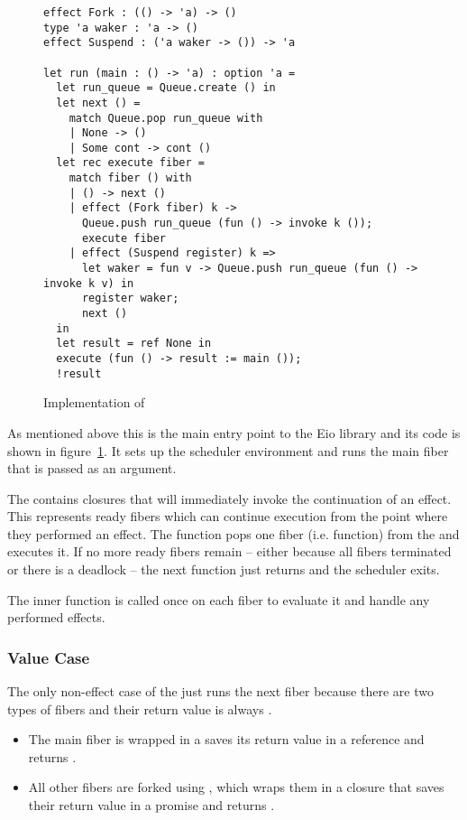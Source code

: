 \subsubsection{}
\label{sec:sched-impl-run}

\begin{figure}[ht]
  \begin{verbatim}
effect Fork : (() -> 'a) -> ()
type 'a waker : 'a -> ()
effect Suspend : ('a waker -> ()) -> 'a

let run (main : () -> 'a) : option 'a =
  let run_queue = Queue.create () in
  let next () =
    match Queue.pop run_queue with
    | None -> ()
    | Some cont -> cont ()
  let rec execute fiber =
    match fiber () with
    | () -> next ()
    | effect (Fork fiber) k ->
      Queue.push run_queue (fun () -> invoke k ());
      execute fiber
    | effect (Suspend register) k =>
      let waker = fun v -> Queue.push run_queue (fun () -> invoke k v) in
      register waker;
      next ()
  in
  let result = ref None in
  execute (fun () -> result := main ());
  !result
  \end{verbatim}
  \caption{Implementation of }
  \label{fig:sched-impl-run}
\end{figure}

As mentioned above this is the main entry point to the Eio library and its code is shown in figure~\ref{fig:sched-impl-run}.
It sets up the scheduler environment and runs the main fiber that is passed as an argument.

The  contains closures that will immediately invoke the continuation of an effect.
This represents ready fibers which can continue execution from the point where they performed an effect.
The  function pops one fiber (i.e. function) from the  and executes it.
If no more ready fibers remain -- either because all fibers terminated or there is a deadlock -- the next function just returns and the scheduler exits.

The inner  function is called once on each fiber to evaluate it and handle any performed effects.
\subsubsection*{Value Case}
The only non-effect case of the  just runs the next fiber because there are two types of fibers and their return value is always \ocamlin{()}.
\begin{itemize}
  \item The main fiber is wrapped in a saves its return value in a reference and returns \ocamlin{()}.
  \item All other fibers are forked using , which wraps them in a closure that saves their return value in a promise and returns \ocamlin{()}.
\end{itemize}

